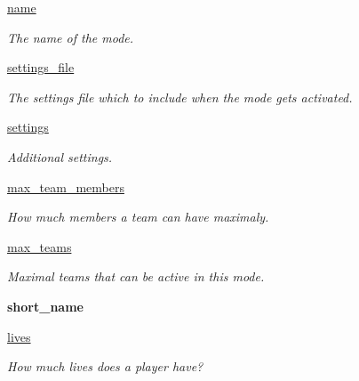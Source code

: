 \begin{DoxyCompactItemize}
\item 
\hyperlink{class_mode_1_1_mode_a38afa93ee0f4ad9e8258a510ccdbaa9c}{name}
\begin{DoxyCompactList}\small\item\em The name of the mode. \item\end{DoxyCompactList}\item 
\hyperlink{class_mode_1_1_mode_a40402dcfd634686dcd9b2ce8b8f3d4eb}{settings\_\-file}
\begin{DoxyCompactList}\small\item\em The settings file which to include when the mode gets activated. \item\end{DoxyCompactList}\item 
\hyperlink{class_mode_1_1_mode_af4bebfeddda24f7437fc086bc52ca711}{settings}
\begin{DoxyCompactList}\small\item\em Additional settings. \item\end{DoxyCompactList}\item 
\hyperlink{class_mode_1_1_mode_ad4ba6cae17b92d4c8c85c35dc9418c8b}{max\_\-team\_\-members}
\begin{DoxyCompactList}\small\item\em How much members a team can have maximaly. \item\end{DoxyCompactList}\item 
\hyperlink{class_mode_1_1_mode_a55c4e205a8cb20550c0f3924471522ab}{max\_\-teams}
\begin{DoxyCompactList}\small\item\em Maximal teams that can be active in this mode. \item\end{DoxyCompactList}\item 
\hypertarget{class_mode_1_1_mode_acffe429e6af52f60fc386830811c33ed}{
{\bfseries short\_\-name}}
\label{class_mode_1_1_mode_acffe429e6af52f60fc386830811c33ed}

\item 
\hyperlink{class_mode_1_1_mode_a62c4256349100a948a336e4f41e73367}{lives}
\begin{DoxyCompactList}\small\item\em How much lives does a player have? \item\end{DoxyCompactList}\end{DoxyCompactItemize}
